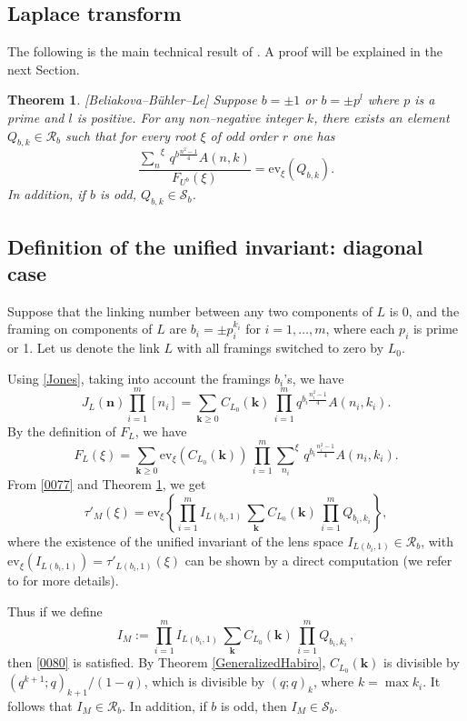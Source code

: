 \documentclass[12pt]{amsart}
\theoremstyle{plain}
\newtheorem{Thm}{Theorem}
\theoremstyle{definition}
\def\R{\mathcal R}
\def\calS{\mathcal S}
\def\bb{\beta}
\def\bn{{\mathbf n}}
\def\bk{\mathbf{k}}
\def\bb{\mathbf{b}}
\def\ev{\mathrm{ev}}
\begin{document}
\subsection{Laplace transform}
The following is the main technical result of \cite{BBL}. A proof will be
explained in the next Section.
\begin{Thm} {\rm [Beliakova--B\"uhler--Le]}
 Suppose $b=\pm 1$ or $b= \pm p^l$ where $p$  is a  prime and $l$ is
positive. For  any non--negative integer $k$,
there exists an element $Q_{b,k} \in \R_b $ such that
for every root $\xi$ of odd order $r$ one has
\[
\frac{{\sum\limits_n}^\xi \, q^{b\frac{n^2-1}{4}} A(n,k) }{F_{U^b}(\xi)}
= \ev_\xi (Q_{b,k}).
\]
\label{0078}
In addition, if $b$ is odd, $Q_{b,k} \in \calS_b $.
\end{Thm}


\subsection{Definition of the unified invariant: diagonal case} \label{2501}
Suppose that the linking number between any two components of $L$
is 0, and  the framing on components of $L$ are $b_i=\pm p_i^{k_i}$ for
$i=1,\dots, m$, where each $p_i$ is prime or 1.
Let us denote the link $L$ with all framings switched to zero by $L_0$.



Using \eqref{Jones}, taking into account the framings $b_i$'s, we have
\[
J_{L}(\bn)\prod_{i=1}^m [n_i] = \sum_{\bk\ge 0} C_{L_0 }
(\bk) \, \prod_{i=1}^m q^{b_i \frac{n_i^2-1}{4}} A(n_i,k_i).
\]
By the definition of $F_{L}$, we have
\[ F_{L}(\xi)= \sum_{\bk \ge 0}
\ev_\xi(C_{L_0 }(\bk)) \, \prod_{i=1}^m
{\sum_{n_i}}^\xi \,  q^{b_i \frac{n_i^2-1}{4}} A(n_i,k_i).
\]
From \eqref{0077} and  Theorem \ref{0078}, we get
\[
\tau'_{M}(\xi) = \ev_\xi \left \{  \prod_{i=1}^m  I_{L(b_i,1)} \,
 \sum_{\bk} C_{L_0 }(\bk) \, \prod_{i=1}^m  Q_{b_i,k_i} \right \},
\]
where the existence of
 the unified invariant of the lens space $I_{L(b_i,1)}\in \R_b$,
with
 $\ev_\xi(I_{L(b_i,1)})=\tau'_{L(b_i,1)}(\xi)$ can be shown by a
direct computation (we refer to \cite{BBL} for more details).

Thus if we define
\[
I_{M}:= \prod_{i=1}^m  I_{L(b_i,1)} \, \sum_{\bk}
C_{L_0 }(\bk) \, \prod_{i=1}^m  Q_{b_i,k_i}\, ,
\]
then \eqref{0080} is satisfied. By Theorem \ref{GeneralizedHabiro},
$C_{L_0 }(\bk)$ is divisible by $(q^{k+1};q)_{k+1}/(1-q)$, which is
divisible by $(q;q)_k$, where $k = \max k_i$. It follows that
$I_{M} \in \R_b$. In addition, if $b$ is odd,
then $I_{M} \in \calS_b$.
\end{document}

